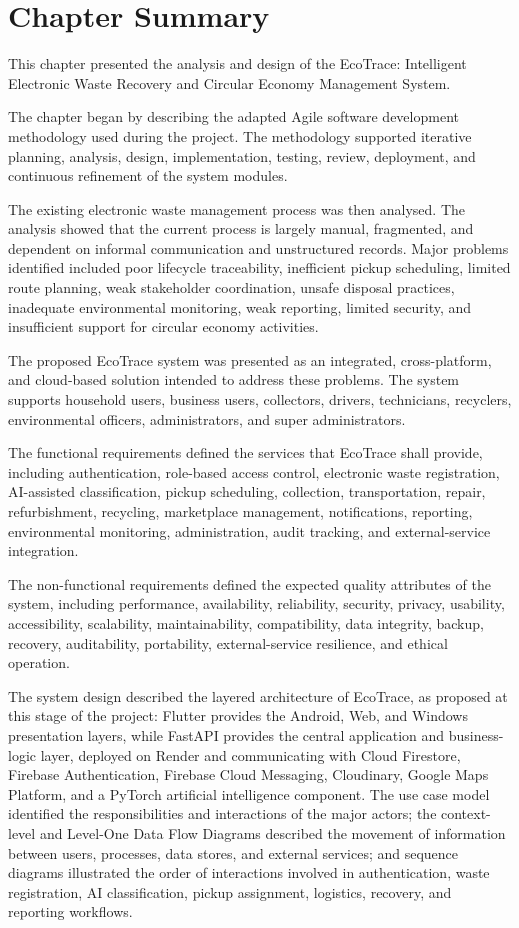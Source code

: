 \section{Chapter Summary}

This chapter presented the analysis and design of the EcoTrace: Intelligent
Electronic Waste Recovery and Circular Economy Management System.

The chapter began by describing the adapted Agile software development
methodology used during the project. The methodology supported iterative
planning, analysis, design, implementation, testing, review, deployment, and
continuous refinement of the system modules.

The existing electronic waste management process was then analysed. The
analysis showed that the current process is largely manual, fragmented, and
dependent on informal communication and unstructured records. Major
problems identified included poor lifecycle traceability, inefficient pickup
scheduling, limited route planning, weak stakeholder coordination, unsafe
disposal practices, inadequate environmental monitoring, weak reporting,
limited security, and insufficient support for circular economy activities.

The proposed EcoTrace system was presented as an integrated,
cross-platform, and cloud-based solution intended to address these problems.
The system supports household users, business users, collectors, drivers,
technicians, recyclers, environmental officers, administrators, and super
administrators.

The functional requirements defined the services that EcoTrace shall
provide, including authentication, role-based access control, electronic waste
registration, AI-assisted classification, pickup scheduling, collection,
transportation, repair, refurbishment, recycling, marketplace management,
notifications, reporting, environmental monitoring, administration, audit
tracking, and external-service integration.

The non-functional requirements defined the expected quality attributes of
the system, including performance, availability, reliability, security, privacy,
usability, accessibility, scalability, maintainability, compatibility, data
integrity, backup, recovery, auditability, portability, external-service
resilience, and ethical operation.

The system design described the layered architecture of EcoTrace, as
proposed at this stage of the project: Flutter provides the Android, Web, and
Windows presentation layers, while FastAPI provides the central application
and business-logic layer, deployed on Render and communicating with Cloud
Firestore, Firebase Authentication, Firebase Cloud Messaging, Cloudinary,
Google Maps Platform, and a PyTorch artificial intelligence component. The
use case model identified the responsibilities and interactions of the major
actors; the context-level and Level-One Data Flow Diagrams described the
movement of information between users, processes, data stores, and external
services; and sequence diagrams illustrated the order of interactions involved
in authentication, waste registration, AI classification, pickup assignment,
logistics, recovery, and reporting workflows.

